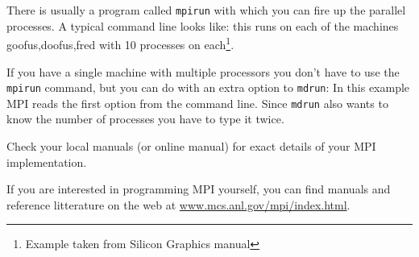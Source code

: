 There is usually a program called {\tt mpirun} with which you can fire
up the parallel processes. A typical command line looks like:
this runs on each of the machines goofus,doofus,fred with 10 processes
on each\footnote{Example taken from Silicon Graphics manual}.

If you have a single machine with multiple processors you don't have to
use the {\tt mpirun} command, but you can do with an extra option to
{\tt mdrun}:
In this example MPI reads the first option from the command line.
Since {\tt mdrun} also wants to know the number of processes you have to
type it twice.

Check your local manuals (or online manual) for exact details
of your MPI implementation.

If you are interested in programming MPI yourself, you can find
manuals and reference litterature on the web at
\href{http:://www.mcs.anl.gov/mpi/index.html}{www.mcs.anl.gov/mpi/index.html}.



